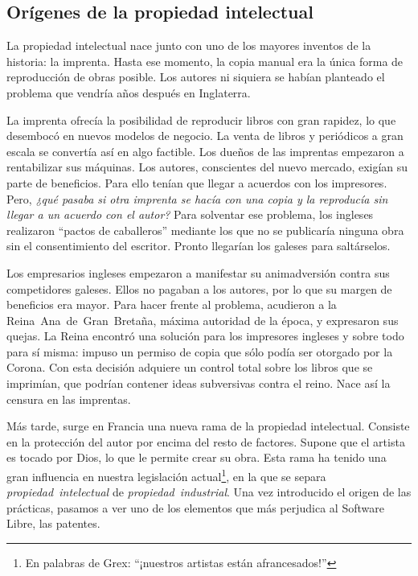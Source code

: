 \subsection{Orígenes de la propiedad intelectual}
La propiedad intelectual nace junto con uno de los mayores inventos de
la historia: la imprenta. Hasta ese momento, la copia manual era la
única forma de reproducción de obras posible. Los autores ni siquiera
se habían planteado el problema que vendría años después en
Inglaterra.

La imprenta ofrecía la posibilidad de reproducir libros con gran
rapidez, lo que desembocó en nuevos modelos de negocio. La venta de
libros y periódicos a gran escala se convertía así en algo
factible. Los dueños de las imprentas empezaron a rentabilizar sus
máquinas. Los autores, conscientes del nuevo mercado, exigían su parte
de beneficios. Para ello tenían que llegar a acuerdos con los
impresores. Pero, \emph{¿qué pasaba si otra imprenta se hacía con una
  copia y la reproducía sin llegar a un acuerdo con el autor?} Para
solventar ese problema, los ingleses realizaron ``pactos de
caballeros'' mediante los que no se publicaría ninguna obra sin el
consentimiento del escritor. Pronto llegarían los galeses para
saltárselos.

Los empresarios ingleses empezaron a manifestar su animadversión
contra sus competidores galeses. Ellos no pagaban a los autores, por
lo que su margen de beneficios era mayor. Para hacer frente al
problema, acudieron a la Reina~Ana~de~Gran~Bretaña, máxima autoridad
de la época, y expresaron sus quejas. La Reina encontró una solución
para los impresores ingleses y sobre todo para sí misma: impuso un
permiso de copia que sólo podía ser otorgado por la Corona. Con esta
decisión adquiere un control total sobre los libros que se imprimían,
que podrían contener ideas subversivas contra el reino. Nace así la
censura en las imprentas.

Más tarde, surge en Francia una nueva rama de la propiedad
intelectual. Consiste en la protección del autor por encima del resto
de factores. Supone que el artista es tocado por Dios, lo que le
permite crear su obra. Esta rama ha tenido una gran influencia en
nuestra legislación actual\footnote{En palabras de Grex: ``¡nuestros
  artistas están afrancesados!''}, en la que se separa
\emph{propiedad~intelectual} de \emph{propiedad~industrial}. Una vez
introducido el origen de las prácticas, pasamos a ver uno de los
elementos que más perjudica al Software Libre, las patentes.

